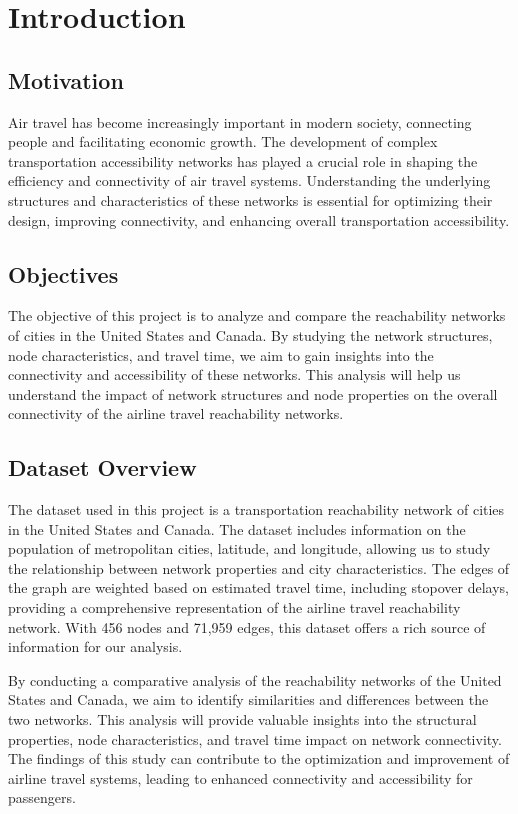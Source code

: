 \section{Introduction}

\subsection{Motivation}

Air travel has become increasingly important in modern society, connecting people and facilitating economic growth. The development of complex transportation accessibility networks has played a crucial role in shaping the efficiency and connectivity of air travel systems. Understanding the underlying structures and characteristics of these networks is essential for optimizing their design, improving connectivity, and enhancing overall transportation accessibility.

\subsection{Objectives}

The objective of this project is to analyze and compare the reachability networks of cities in the United States and Canada.\cite{snap-reachability} By studying the network structures, node characteristics, and travel time, we aim to gain insights into the connectivity and accessibility of these networks. This analysis will help us understand the impact of network structures and node properties on the overall connectivity of the airline travel reachability networks.

\subsection{Dataset Overview}

The dataset used in this project is a transportation reachability network of cities in the United States and Canada. The dataset includes information on the population of metropolitan cities, latitude, and longitude, allowing us to study the relationship between network properties and city characteristics.\cite{benson2016higher} The edges of the graph are weighted based on estimated travel time, including stopover delays, providing a comprehensive representation of the airline travel reachability network.\cite{frey2007clustering} With 456 nodes and 71,959 edges, this dataset offers a rich source of information for our analysis.

By conducting a comparative analysis of the reachability networks of the United States and Canada, we aim to identify similarities and differences between the two networks. This analysis will provide valuable insights into the structural properties, node characteristics, and travel time impact on network connectivity. The findings of this study can contribute to the optimization and improvement of airline travel systems, leading to enhanced connectivity and accessibility for passengers.
